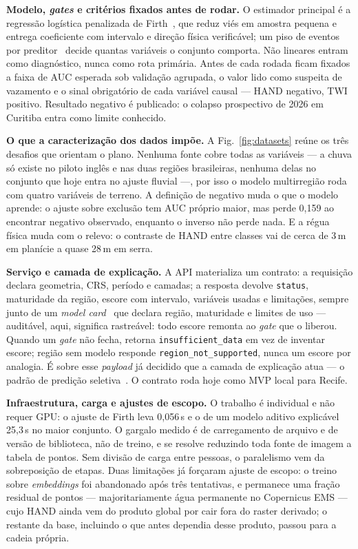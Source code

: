 \documentclass[conference]{IEEEtran}
\begin{document}
\textbf{Modelo, \emph{gates} e critérios fixados antes de rodar.} O estimador
principal é a regressão logística penalizada de Firth~\cite{firth1993}, que reduz
viés em amostra pequena e entrega coeficiente com intervalo e direção física
verificável; um piso de eventos por preditor~\cite{peduzzi1996} decide quantas
variáveis o conjunto comporta. Não lineares entram como diagnóstico, nunca como
rota primária. Antes de cada rodada ficam fixados a faixa de AUC esperada sob
validação agrupada, o valor lido como suspeita de vazamento e o sinal obrigatório
de cada variável causal --- HAND negativo, TWI positivo. Resultado negativo é
publicado: o colapso prospectivo de 2026 em Curitiba entra como limite
conhecido.

\textbf{O que a caracterização dos dados impõe.} A Fig.~\ref{fig:datasets} reúne
os três desafios que orientam o plano. Nenhuma fonte cobre todas as
variáveis --- a chuva só existe no piloto inglês e nas duas regiões
brasileiras, nenhuma delas no conjunto que hoje entra no ajuste fluvial ---,
por isso o modelo multirregião roda com quatro variáveis de terreno. A
definição de negativo muda o que o modelo aprende: o
ajuste sobre exclusão tem AUC próprio maior, mas perde 0,159 ao encontrar
negativo observado, enquanto o inverso não perde nada. E a régua física muda com
o relevo: o contraste de HAND entre classes vai de cerca de 3\,m em planície a
quase 28\,m em serra.

\textbf{Serviço e camada de explicação.} A API materializa um contrato: a
requisição declara geometria, CRS, período e camadas; a resposta devolve
\texttt{status}, maturidade da região, escore com intervalo, variáveis usadas e
limitações, sempre junto de um \emph{model card}~\cite{mitchell2019} que declara
região, maturidade e limites de uso --- auditável, aqui, significa rastreável:
todo escore remonta ao \emph{gate} que o liberou. Quando um \emph{gate} não
fecha, retorna \texttt{insufficient\_data} em vez de inventar escore; região sem
modelo responde \texttt{region\_not\_supported}, nunca um escore por analogia. É
sobre esse \emph{payload} já decidido que a camada de explicação atua --- o
padrão de predição seletiva~\cite{mitchell2019}. O contrato roda hoje como MVP
local para Recife.

\textbf{Infraestrutura, carga e ajustes de escopo.} O trabalho é individual e não
requer GPU: o ajuste de Firth leva 0,056\,s e o de um modelo aditivo explicável
25,3\,s no maior conjunto. O gargalo medido é de carregamento de arquivo e de
versão de biblioteca, não de treino, e se resolve reduzindo toda fonte de imagem
a tabela de pontos. Sem divisão de carga entre pessoas, o paralelismo vem da
sobreposição de etapas. Duas limitações já forçaram ajuste de escopo: o treino
sobre \emph{embeddings} foi abandonado após três tentativas, e permanece uma
fração residual de pontos --- majoritariamente água permanente no Copernicus
EMS --- cujo HAND ainda vem do produto global por cair fora do raster
derivado; o restante da base, incluindo o que antes dependia desse produto,
passou para a cadeia própria.
\end{document}
